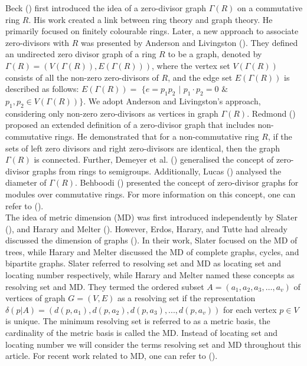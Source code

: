 \documentclass[]{interact}
\theoremstyle{plain}%
\theoremstyle{definition}
\theoremstyle{remark}
\begin{document}
\noindent Beck  (\cite{beck}) first introduced the idea of a zero-divisor graph $\Gamma(R)$ on a commutative ring $R$. His work created a link between ring theory and graph theory. He primarily focused on finitely colourable rings. Later, a new approach to associate zero-divisors with $R$ was presented by Anderson and Livingston (\cite{anderson}). They defined an undirected zero divisor graph of a ring $R$ to be a graph, denoted by $\Gamma(R) = (V(\Gamma(R)), E(\Gamma(R)))$, where the vertex set $V(\Gamma(R))$ consists of all the non-zero zero-divisors of $R$, and the edge set $E(\Gamma(R))$ is described as follows: $E(\Gamma(R)) = $ $\{e = p_1p_2$ $ |$ $
p_1 \cdot p_2 = 0$  $\&$ $  p_1, p_2 \in V(\Gamma(R))\}$. We adopt Anderson and Livingston's approach, considering only non-zero zero-divisors as vertices in graph $\Gamma(R)$. Redmond (\cite{redmond}) proposed an extended definition of a zero-divisor graph that includes non-commutative rings. He demonstrated that for a non-commutative ring $R$, if the sets of left zero divisors and right zero-divisors are identical, then the graph $\Gamma(R)$ is connected. Further, Demeyer et al. (\cite{demyer}) generalised the concept of zero-divisor graphs from rings to semigroups. Additionally, Lucas (\cite{lucas}) analysed the diameter of $\Gamma(R)$. Behboodi (\cite{behboodi}) presented the concept of zero-divisor graphs for modules over commutative rings. For more information on this concept, one can refer to (\cite{sing,vk, ak}).\\

\noindent The idea of metric dimension (MD) was first introduced independently by Slater (\cite{sl}), and Harary and Melter (\cite{ha}). However, Erdos, Harary, and Tutte had already discussed the dimension of graphs (\cite{er}). In their work, Slater focused on the MD of trees, while Harary and Melter discussed the MD of complete graphs, cycles, and bipartite graphs. Slater referred to resolving set and MD as locating set and locating number respectively, while Harary and Melter named these concepts as resolving set and MD. They termed the ordered subset $A=(a_1,a_2,a_3, \ldots,a_v)$ of vertices of graph $G= (V, E)$ as a resolving set if the representation $\delta(p|A)=(d(p,a_1),d(p,a_2), d(p,a_3),...,d(p,a_v))$ for each vertex $p\in V$ is unique. The minimum resolving set is referred to as a metric basis, the cardinality of the metric basis is called the MD. Instead of locating set and locating number we will consider the terms resolving set and MD throughout this article. For recent work related to MD, one can refer to (\cite{alshe, nazeer, anand, sha, vid}).\\
   
\end{document}
